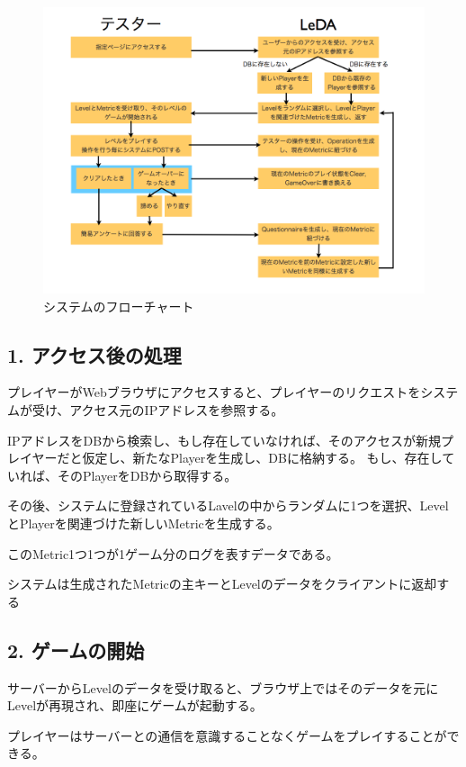 \begin{figure}[htbp]
  \begin{center}
    \includegraphics[bb=0 0 1024 768, width=15cm]{images/flow.png}
  \end{center}
  \caption{システムのフローチャート}
  \label{fig:one}
\end{figure}

\subsection{1. アクセス後の処理}
プレイヤーがWebブラウザにアクセスすると、プレイヤーのリクエストをシステムが受け、アクセス元のIPアドレスを参照する。

IPアドレスをDBから検索し、もし存在していなければ、そのアクセスが新規プレイヤーだと仮定し、新たなPlayerを生成し、DBに格納する。
もし、存在していれば、そのPlayerをDBから取得する。

その後、システムに登録されているLavelの中からランダムに1つを選択、LevelとPlayerを関連づけた新しいMetricを生成する。

このMetric1つ1つが1ゲーム分のログを表すデータである。

システムは生成されたMetricの主キーとLevelのデータをクライアントに返却する

\subsection{2. ゲームの開始}
サーバーからLevelのデータを受け取ると、ブラウザ上ではそのデータを元にLevelが再現され、即座にゲームが起動する。

プレイヤーはサーバーとの通信を意識することなくゲームをプレイすることができる。

